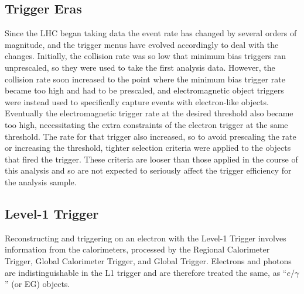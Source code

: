 \subsection{Trigger Eras}
\label{evSel:triggerEras}
Since the LHC began taking data the event rate has changed by several orders of magnitude,  
and the trigger menus have evolved accordingly to deal with the changes.  
Initially, the collision rate was so low that minimum bias triggers ran unprescaled, 
so they were used to take the first analysis data.  
However, the collision rate soon increased to the point where the minimum bias trigger rate became too high
and had to be prescaled, 
and 
electromagnetic object %
triggers were instead used %
to specifically capture events with electron-like objects.  %
Eventually the 
electromagnetic 
trigger rate at the desired threshold also became too high,
necessitating the extra constraints of the electron trigger at the same threshold.  
The rate for that trigger also increased, so to avoid prescaling the rate or increasing the threshold,
tighter selection criteria were applied to the objects that fired the trigger.  
These criteria are looser than those applied in the course of this analysis and so are not expected
to seriously affect the trigger efficiency for the analysis sample.  



\subsection{Level-1 Trigger}
\label{evSel:L1}
Reconstructing and triggering on an electron with the Level-1 Trigger 
involves information from the calorimeters, processed by 
the Regional Calorimeter Trigger, Global Calorimeter Trigger, and 
Global Trigger.  
Electrons and photons are indistinguishable in the L1 trigger and are therefore 
treated the same, as ``$e/\gamma$'' (or EG) objects.  


